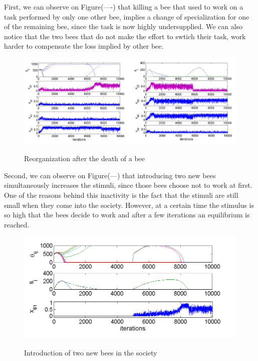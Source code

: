 First, we can observe on Figure(----) that killing a bee that used
to work on a task performed by only one other bee, implies a change
of specialization for one of the remaining bee, since the task is
now highly undersupplied. We can also notice that the two bees that
do not make the effort to swtich their task, work harder to compensate
the loss implied by other bee.
\begin{figure}
\begin{centering}
\includegraphics[scale=0.4]{figures/FIgure4}
\label{fig:figure6}
\par\end{centering}

\centering{}\caption{Reorganization after the death of a bee}
\end{figure}


Second, we can observe on Figure(---) that introducing two new bees
simultaneously increases the stimuli, since those bees choose not
to work at first. One of the reasons behind this inactivity is the
fact that the stimuli are still small when they come into the society.
However, at a certain time the stimulus is so high that the bees decide
to work and after a few iterations an equilibrium is reached.

\begin{figure}
\begin{centering}
\includegraphics[scale=0.8]{figures/Figure5}
\label{fig:figure7}
\par\end{centering}

\centering{}\caption{Introduction of two new bees in the society}
\end{figure}


